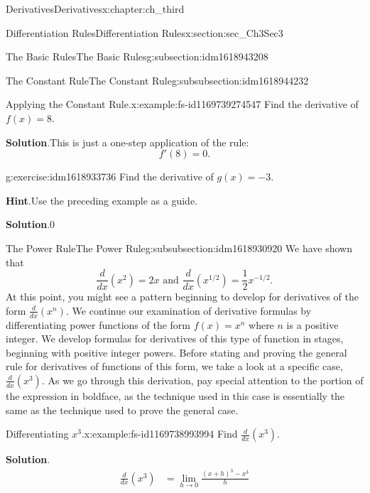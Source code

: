 \documentclass[oneside,10pt,]{book}
\newcommand{\blocktitlefont}{\relax}
\numberwithin{equation}{section}
\newcommand{\amp}{&}
\begin{document}
\begin{chapterptx}{Derivatives}{}{Derivatives}{}{}{x:chapter:ch_third}
\begin{sectionptx}{Differentiation Rules}{}{Differentiation Rules}{}{}{x:section:sec_Ch3Sec3}
\begin{subsectionptx}{The Basic Rules}{}{The Basic Rules}{}{}{g:subsection:idm1618943208}
\begin{subsubsectionptx}{The Constant Rule}{}{The Constant Rule}{}{}{g:subsubsection:idm1618944232}
\begin{example}{Applying the Constant Rule.}{x:example:fs-id1169739274547}
Find the derivative of \(f(x)=8.\)%
\par\smallskip%
\noindent\textbf{\blocktitlefont Solution}.\hypertarget{g:solution:idm1618931816}{}\quad{}This is just a one-step application of the rule:%
%
\begin{equation*}
f'(8)=0.
\end{equation*}
\end{example}
\begin{inlineexercise}{}{g:exercise:idm1618933736}%
Find the derivative of \(g(x)=-3.\)%
\par\smallskip%
\noindent\textbf{\blocktitlefont Hint}.\hypertarget{g:hint:idm1618930664}{}\quad{}Use the preceding example as a guide.%
\par\smallskip%
\noindent\textbf{\blocktitlefont Solution}.\hypertarget{g:solution:idm1618932456}{}\quad{}0%
\end{inlineexercise}%
\end{subsubsectionptx}
%
%
\typeout{************************************************}
\typeout{************************************************}
%
\begin{subsubsectionptx}{The Power Rule}{}{The Power Rule}{}{}{g:subsubsection:idm1618930920}
We have shown that%
%
\begin{equation*}
\frac{d}{dx}(x^2)=2x \text{ and } \frac{d}{dx}(x^{1/2})=\frac{1}{2}x^{-1/2}.
\end{equation*}
At this point, you might see a pattern beginning to develop for derivatives of the form \(\frac{d}{dx}(x^n).\) We continue our examination of derivative formulas by differentiating power functions of the form \(f(x)=x^n\) where \(n\) is a positive integer. We develop formulas for derivatives of this type of function in stages, beginning with positive integer powers. Before stating and proving the general rule for derivatives of functions of this form, we take a look at a specific case, \(\frac{d}{dx}(x^3).\) As we go through this derivation, pay special attention to the portion of the expression in boldface, as the technique used in this case is essentially the same as the technique used to prove the general case.%
\begin{example}{Differentiating \(x^3\).}{x:example:fs-id1169738993994}%
Find \(\frac{d}{dx}(x^3).\)%
\par\smallskip%
\noindent\textbf{\blocktitlefont Solution}.\hypertarget{g:solution:idm1618925928}{}\quad{}%
\begin{align*}
\frac{d}{dx}(x^3)\amp=\lim_{h\to 0}\frac{(x+h)^3-x^3}{h}\\

\end{align*}
\end{example}
\end{subsubsectionptx}
\end{subsectionptx}
\end{sectionptx}
\end{chapterptx}
\end{document}
